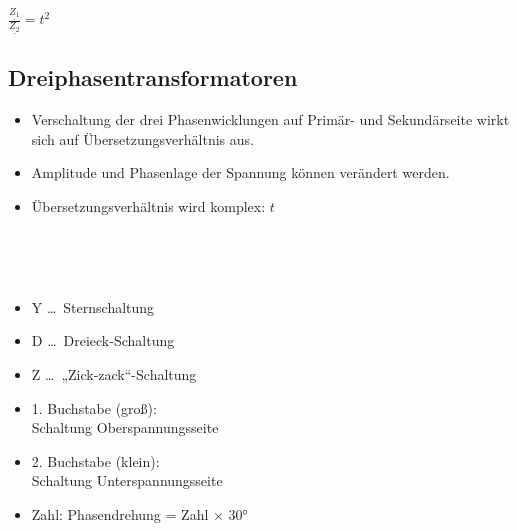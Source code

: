 \vspace{0.15cm}

$
    \boxed{\frac{\underline{Z_1}}{\underline{Z_2}} = t^2}
$


\subsection{Dreiphasentransformatoren}

\begin{itemize}
    \item Verschaltung der drei Phasenwicklungen auf Primär- und Sekundärseite wirkt sich auf Übersetzungsverhältnis aus.
    \item Amplitude und Phasenlage der Spannung können verändert werden.
    \item Übersetzungsverhältnis wird komplex: \( t \)
\end{itemize}

\vspace{0.15cm}

\begin{minipage}[c]{0.48\columnwidth}
    \\
\end{minipage}
\hfill
\begin{minipage}[c]{0.48\columnwidth}
    \\
\end{minipage}

\begin{minipage}[c]{0.48\columnwidth}
    \begin{itemize}
        \item Y \dots\ Sternschaltung
        \item D \dots\ Dreieck-Schaltung
        \item Z \dots\ „Zick-zack“-Schaltung
    \end{itemize}
\end{minipage}
\hfill
\begin{minipage}[c]{0.48\columnwidth}
    \begin{itemize}
        \item 1. Buchstabe (groß): \\
        Schaltung Oberspannungsseite
        \item 2. Buchstabe (klein): \\
        Schaltung Unterspannungsseite
        \item Zahl: Phasendrehung = Zahl \( \times \) 30°
    \end{itemize}
\end{minipage}

